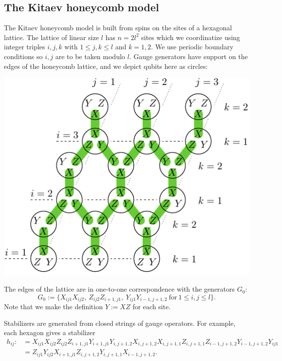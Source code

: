 \documentclass[12pt]{article}
\begin{document}
\subsection{The Kitaev honeycomb model}




The Kitaev honeycomb model \cite{Kitaev2006} is built from spins on
the sites of a hexagonal lattice. 
The lattice of linear size $l$ has $n=2l^2$ sites
which we coordinatize using integer triples $i, j, k$
with $1\le j, k\le l$ and $k=1, 2.$
We use periodic boundary conditions so $i, j$ are
to be taken modulo $l$.
Gauge generators have support on the edges of the honeycomb lattice,
and we depict qubits here as circles:
\begin{center}
\includegraphics[width=0.6\columnwidth]{fig_00.pdf}
\end{center}
The edges of the lattice are in one-to-one
correspondence with the generators $G_0$:
$$
G_0 := \big\{X_{ij1}X_{ij2},\ Z_{ij2}Z_{i+1,j1},\ Y_{ij1}Y_{i-1,j+1,2}
\ \mbox{for}\ 1\le i,j\le l\big\}.
$$
Note that we make the definition $Y:=XZ$ for each site.

Stabilizers are generated from closed strings of
gauge operators. 
For example, each hexagon gives a stabilizer
\begin{align*}
h_{ij}:&= 
X_{ij1}X_{ij2}
Z_{ij2}Z_{i+1,j1}
Y_{i+1,j1}Y_{i,j+1,2}
X_{i,j+1,2}X_{i,j+1,1}
Z_{i,j+1,1}Z_{i-1,j+1,2}
Y_{i-1,j+1,2}Y_{ij1}
\\
&= 
Z_{ij1} Y_{ij2} X_{i+1,j1}
Z_{i,j+1,2} Y_{i,j+1,1} X_{i-1,j+1,2}.
\end{align*}
\end{document}
